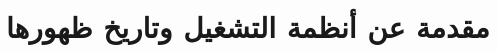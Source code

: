 \documentclass[document.tex]{subfiles}
\begin{document}
\chapter{مقدمة عن أنظمة التشغيل وتاريخ ظهورها}
\end{document}
